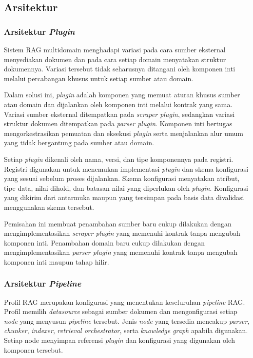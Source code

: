 \subsection{Arsitektur}
\label{sec:solusi-arsitektur}

\subsubsection{Arsitektur \textit{Plugin}}
\label{sec:solusi-arsitektur-plugin}

Sistem RAG multidomain menghadapi variasi pada cara sumber eksternal menyediakan dokumen dan pada cara setiap domain menyatakan struktur dokumennya.
Variasi tersebut tidak seharusnya ditangani oleh komponen inti melalui percabangan khusus untuk setiap sumber atau domain.

Dalam solusi ini, \textit{plugin} adalah komponen yang memuat aturan khusus sumber atau domain dan dijalankan oleh komponen inti melalui kontrak yang sama.
Variasi sumber eksternal ditempatkan pada \textit{scraper plugin}, sedangkan variasi struktur dokumen ditempatkan pada \textit{parser plugin}.
Komponen inti bertugas mengorkestrasikan pemuatan dan eksekusi \textit{plugin} serta menjalankan alur umum yang tidak bergantung pada sumber atau domain.

Setiap \textit{plugin} dikenali oleh nama, versi, dan tipe komponennya pada registri.
Registri digunakan untuk menemukan implementasi \textit{plugin} dan skema konfigurasi yang sesuai sebelum proses dijalankan.
Skema konfigurasi menyatakan atribut, tipe data, nilai dihold, dan batasan nilai yang diperlukan oleh \textit{plugin}.
Konfigurasi yang dikirim dari antarmuka maupun yang tersimpan pada basis data divalidasi menggunakan skema tersebut.

Pemisahan ini membuat penambahan sumber baru cukup dilakukan dengan mengimplementasikan \textit{scraper plugin} yang memenuhi kontrak tanpa mengubah komponen inti.
Penambahan domain baru cukup dilakukan dengan mengimplementasikan \textit{parser plugin} yang memenuhi kontrak tanpa mengubah komponen inti maupun tahap hilir.

\subsubsection{Arsitektur \textit{Pipeline}}
\label{sec:solusi-arsitektur-pipeline}

Profil RAG merupakan konfigurasi yang menentukan keseluruhan \textit{pipeline} RAG.
Profil memilih \textit{datasource} sebagai sumber dokumen dan mengonfigurasi setiap \textit{node} yang menyusun \textit{pipeline} tersebut.
Jenis \textit{node} yang tersedia mencakup \textit{parser}, \textit{chunker}, \textit{indexer}, \textit{retrieval orchestrator}, serta \textit{knowledge graph} apabila digunakan.
Setiap node menyimpan referensi \textit{plugin} dan konfigurasi yang digunakan oleh komponen tersebut.

